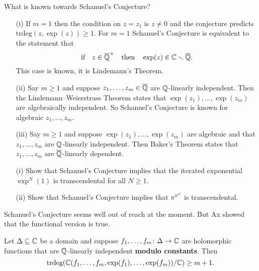 \begin{example} What is known towards Schanuel's Conjecture?
  \begin{enumerate}
  \item [(i)]
  If $m=1$ then the condition on $z=z_1$ is $z\not=0$ and the
  conjecture predicts $\mathrm{trdeg}(z,\exp(z))\ge 1$.
  For $m=1$ Schanuel's Conjecture is equivalent to the statement that
  \begin{equation*}
    \text{if}\quad z\in{\overline{\mathbb{Q}}}^\times \quad\text{then}\quad \exp(z)\in {\mathbb{C}}\smallsetminus {\overline{\mathbb{Q}}}.
  \end{equation*}
  This case is known, it is Lindemann's Theorem.
  \item[(ii)] Say $m\ge 1$ and suppose $z_1,\ldots,z_m\in{\overline{\mathbb{Q}}}$ are
    ${\mathbb{Q}}$-linearly independent. Then the Lindemann--Weierstrass
    Theorem states that $\exp(z_1),\ldots,\exp(z_m)$ are algebraically
    independent. So Schanuel's Conjecture is known for algebraic $z_1,\ldots,z_m$.
  \item[(iii)] Say $m\ge 1$ and suppose $\exp(z_1),\ldots,\exp(z_m)$
    are algebraic and that $z_1,\ldots,z_m$ are ${\mathbb{Q}}$-linearly
    independent. Then Baker's Theorem states that $z_1,\ldots,z_m$ are
    ${\overline{\mathbb{Q}}}$-linearly dependent. 
\end{enumerate}
\end{example}

\begin{exercise}
  \begin{enumerate}
  \item [(i)]  Show that Schanuel's Conjecture implies that the iterated
    exponential $\exp^N(1)$ is
    transcendental for all $N\ge 1$.
  \item[(ii)] Show that Schanuel's Conjecture implies that
    $\pi^{\pi^{\pi^\pi}}$ is transcendental.
  \end{enumerate}
\end{exercise}

Schanuel's Conjecture seems well out of reach at the moment.
But Ax showed that the functional version is true. 

\begin{theorem}
  \label{thm:Axmult}
  Let $\Delta\subseteq{\mathbb{C}}$ be a domain and suppose
  $f_1,\ldots,f_m \colon\Delta \rightarrow{\mathbb{C}}$ are holomorphic
  functions that are ${\mathbb{Q}}$-linearly independent \textbf{modulo
    constants}. Then
  \begin{equation*}
    \mathrm{trdeg}({\mathbb{C}}(f_1,\ldots,f_m,\exp(f_1),\ldots,\exp(f_m))/{\mathbb{C}}) \ge
    m+1. 
  \end{equation*}  
\end{theorem}

